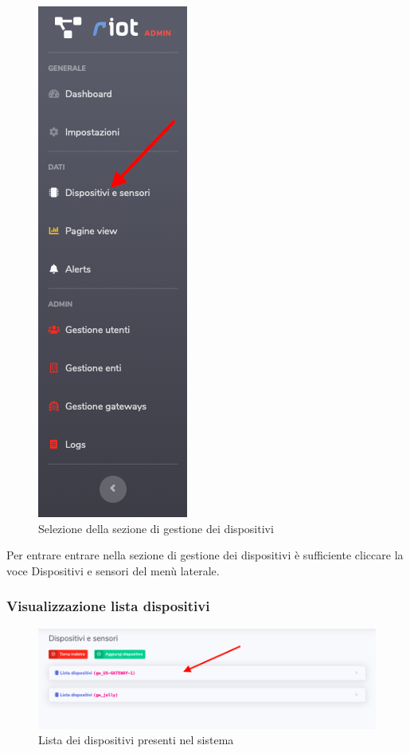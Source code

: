 		\begin{figure}[H]
		\centering
		\includegraphics[scale=0.600]{res/images/admin/menuDisp.png}
		\caption{Selezione della sezione di gestione dei dispositivi}
	\end{figure}

		Per entrare entrare nella sezione di gestione dei dispositivi è sufficiente cliccare la voce Dispositivi e sensori del menù laterale.

	\subsubsection{Visualizzazione lista dispositivi}

		\begin{figure}[H]
		\centering
		\includegraphics[scale=0.600]{res/images/admin/listaDisp.png}
		\caption{Lista dei dispositivi presenti nel sistema}
	\end{figure}

